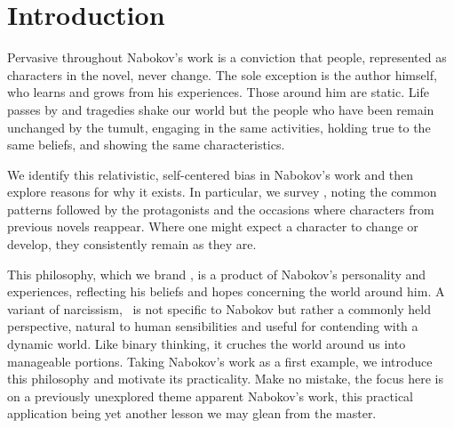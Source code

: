 \section{Introduction}
\label{intro}

Pervasive throughout Nabokov's work is a conviction that people, represented as characters in the novel, never change. 
The sole exception is the author himself, who learns and grows from his experiences.
Those around him are static.
Life passes by and tragedies shake our world but the people who have been remain unchanged by the tumult, engaging in the same activities, holding true to the same beliefs, and showing the same characteristics.

We identify this relativistic, self-centered bias in Nabokov's work and then explore reasons for why it exists.
In particular, we survey , noting the common patterns followed by the protagonists and the occasions where characters from previous novels reappear.
Where one might expect a character to change or develop, they consistently remain as they are. 

This philosophy, which we brand \emph{\philo}, is a product of Nabokov's personality and experiences, reflecting his beliefs and hopes concerning the world around him.
A variant of narcissism, \philo~is not specific to Nabokov but rather a commonly held perspective, natural to human sensibilities and useful for contending with a dynamic world.
Like binary thinking, it cruches the world around us into manageable portions.
Taking Nabokov's work as a first example, we introduce this philosophy and motivate its practicality.
Make no mistake, the focus here is on a previously unexplored theme apparent Nabokov's work, this practical application being yet another lesson we may glean from the master.


